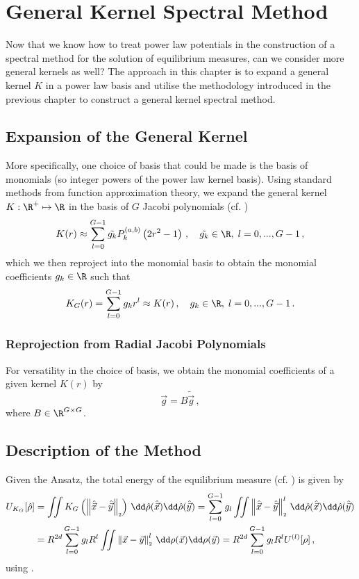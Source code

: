 \chapter{General Kernel Spectral Method}
\label{chap:general-kernel-spectral-method}

Now that we know how to treat power law potentials in the construction of a spectral method for the solution of equilibrium measures, can we consider more general kernels as well?
The approach in this chapter is to expand a general kernel $K$ in a power law basis and utilise the methodology introduced in the previous chapter to construct a general kernel spectral method.

\section{Expansion of the General Kernel}
More specifically, one choice of basis that could be made is the basis of monomials (so integer powers of the power law kernel basis).
Using standard methods from function approximation theory, we expand the general kernel $K: \R^+ \mapsto \R$ in the basis of $G$ Jacobi polynomials (cf. )
$$K(r) \approx \sum_{l=0}^{G-1} \tilde{g_k} P_k^{(a, b)}\left(2 r^2 - 1\right)\,, \quad \tilde{g_k} \in \R, \;l = 0, ..., G-1\,,$$
which we then reproject into the monomial basis to obtain the monomial coefficients $g_k \in \R$ such that
\begin{equation}
  K_G(r) = \sum_{l=0}^{G-1} g_k r^l \approx K(r)\,,\quad g_k \in \R, \;l=0, ..., G-1\,.
  \label{eq:monomial-expansion}
\end{equation}

\subsection{Reprojection from Radial Jacobi Polynomials}
For versatility in the choice of basis, we obtain the monomial coefficients of a given kernel $K(r)$ by
$$\vec{g} = B \tilde{\vec{g}}\,,$$
where $B \in \R^{G \times G}$.


\section{Description of the Method}
Given the Ansatz, the total energy of the equilibrium measure (cf. ) is given by
\begin{align*}
  U_{K_G}[\hat{\rho}] & = \iint K_G\left(\norm{\hatvec{x}-\hatvec{y}}\right) \,\dd\hat{\rho}(\hatvec{x})\dd\hat{\rho}(\hatvec{y})
  = \sum_{l=0}^{G-1} g_l \iint \norm{\hatvec{x}-\hatvec{y}}^l \,\dd\hat{\rho}(\hatvec{x})\dd\hat{\rho}(\hatvec{y})                \\
                      & = R^{2d} \sum_{l=0}^{G-1} g_l R^l \iint \norm{\vec{x}-\vec{y}}^l \,\dd\rho(\vec{x})\dd\rho(\vec{y})
  = R^{2d} \sum_{l=0}^{G-1} g_l R^l U^{(l)}[\rho]\,,
\end{align*}
using .

